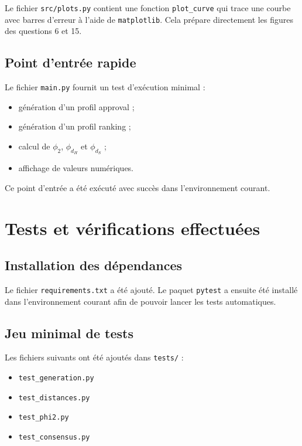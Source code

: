 \documentclass[11pt,a4paper]{article}
\begin{document}
Le fichier \texttt{src/plots.py} contient une fonction \texttt{plot\_curve} qui trace une courbe avec barres d'erreur \`a l'aide de \texttt{matplotlib}. Cela pr\'epare directement les figures des questions 6 et 15.

\subsection{Point d'entr\'ee rapide}

Le fichier \texttt{main.py} fournit un test d'ex\'ecution minimal :
\begin{itemize}[leftmargin=*]
    \item g\'en\'eration d'un profil approval ;
    \item g\'en\'eration d'un profil ranking ;
    \item calcul de \(\phi_2\), \(\phi_{d_H}\) et \(\phi_{d_S}\) ;
    \item affichage de valeurs num\'eriques.
\end{itemize}

Ce point d'entr\'ee a \'et\'e ex\'ecut\'e avec succ\`es dans l'environnement courant.

\section{Tests et v\'erifications effectu\'ees}

\subsection{Installation des d\'ependances}

Le fichier \texttt{requirements.txt} a \'et\'e ajout\'e. Le paquet \texttt{pytest} a ensuite \'et\'e install\'e dans l'environnement courant afin de pouvoir lancer les tests automatiques.

\subsection{Jeu minimal de tests}

Les fichiers suivants ont \'et\'e ajout\'es dans \texttt{tests/} :
\begin{itemize}[leftmargin=*]
    \item \texttt{test\_generation.py}
    \item \texttt{test\_distances.py}
    \item \texttt{test\_phi2.py}
    \item \texttt{test\_consensus.py}
\end{itemize}
\end{document}
